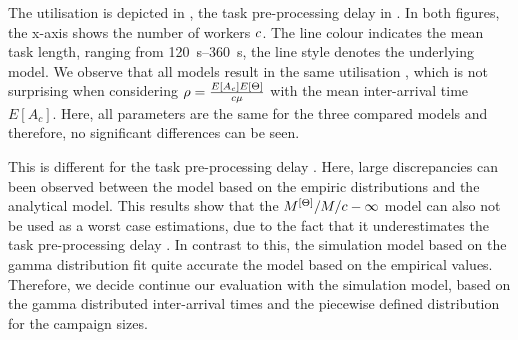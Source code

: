 The utilisation \workerUtilization is depicted in , the task pre-processing delay \preTaskProcessingDelay in .
In both figures, the x-axis shows the number of workers \(c\).
The line colour indicates the mean task length, ranging from \SIrange{120}{360}{\second}, the line style denotes the underlying model.
We observe that all models result in the same utilisation \workerUtilization, which is not surprising when considering \(\rho = \frac{E[A_c] E[\Theta]}{c\mu}\) with the mean inter-arrival time \(E[A_c]\).
Here, all parameters are the same for the three compared models and therefore, no significant differences can be seen.

This is different for the task pre-processing delay \preTaskProcessingDelay. 
Here, large discrepancies can been observed between the model based on the empiric distributions and the analytical model.
This results show that the \(M^{[\Theta]}/M/c-\infty\) model can also not be used as a worst case estimations, due to the fact that it underestimates the task pre-processing delay \preTaskProcessingDelay.
In contrast to this, the simulation model based on the gamma distribution fit quite accurate the model based on the empirical values.
Therefore, we decide continue our evaluation with the simulation model, based on the gamma distributed inter-arrival times and the piecewise defined distribution for the campaign sizes.

